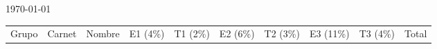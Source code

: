 \documentclass[]{article}
\begin{document}
        \newcommand{\NoE}{\textbf{*}}
        \newcommand{\NoN}{\textbf{—}}
        \newcommand{\NoX}{\textbf{?}}

        \begin{center}
          \today
        \end{center}

        \begin{table}[h!]
        \begin{center}
        \begin{tabular}{ | r | l | l | r | r | r | r | r | r | r | }
                \hline
                Grupo
                & Carnet  & Nombre                           & E1 (4\%)              & T1 (2\%)              & E2 (6\%)              & T2 (3\%)              & E3 (11\%)             & T3 (4\%)              & Total \\


\end{tabular}
\end{center}
\end{table}
\end{document}
